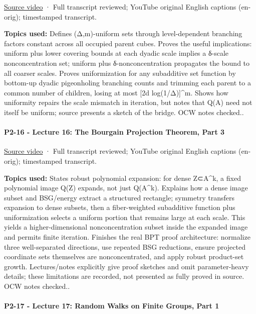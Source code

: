 \href{https://www.youtube.com/watch?v=1lql9PGvLG4}{Source video} · Full transcript reviewed; YouTube original English captions (en-orig); timestamped transcript.

\textbf{Topics used:} Defines (Δ,m)-uniform sets through level-dependent branching factors constant across all occupied parent cubes. Proves the useful implications: uniform plus lower covering bounds at each dyadic scale implies a δ-scale nonconcentration set; uniform plus δ-nonconcentration propagates the bound to all coarser scales. Proves uniformization for any subadditive set function by bottom-up dyadic pigeonholing branching counts and trimming each parent to a common number of children, losing at most {[}2d log(1/Δ){]}\^{}m. Shows how uniformity repairs the scale mismatch in iteration, but notes that Q(A) need not itself be uniform; source presents a sketch of the bridge. OCW notes checked..

\paragraph{P2-16 - Lecture 16: The Bourgain Projection Theorem, Part 3}\label{p2-16---lecture-16-the-bourgain-projection-theorem-part-3}

\href{https://www.youtube.com/watch?v=85YISwhp7MQ}{Source video} · Full transcript reviewed; YouTube original English captions (en-orig); timestamped transcript.

\textbf{Topics used:} States robust polynomial expansion: for dense Z⊂A\^{}k, a fixed polynomial image Q(Z) expands, not just Q(A\^{}k). Explains how a dense image subset and BSG/energy extract a structured rectangle; symmetry transfers expansion to dense subsets, then a fiber-weighted subadditive function plus uniformization selects a uniform portion that remains large at each scale. This yields a higher-dimensional nonconcentration subset inside the expanded image and permits finite iteration. Finishes the real BPT proof architecture: normalize three well-separated directions, use repeated BSG reductions, ensure projected coordinate sets themselves are nonconcentrated, and apply robust product-set growth. Lectures/notes explicitly give proof sketches and omit parameter-heavy details; these limitations are recorded, not presented as fully proved in source. OCW notes checked..

\paragraph{P2-17 - Lecture 17: Random Walks on Finite Groups, Part 1}\label{p2-17---lecture-17-random-walks-on-finite-groups-part-1}

